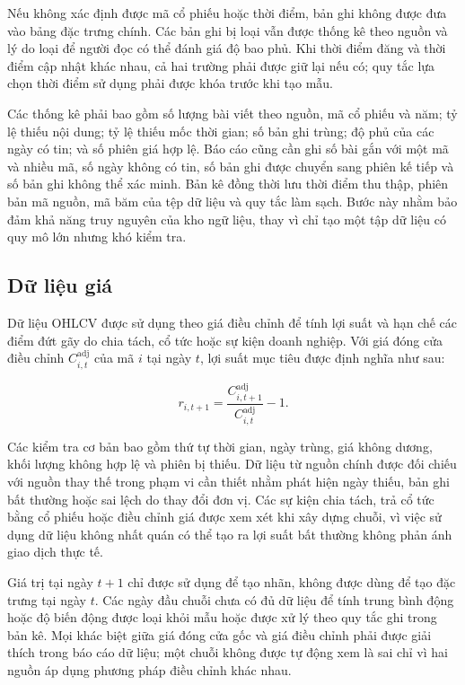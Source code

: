 \documentclass[12pt, a4paper, oneside]{report}
\begin{document}
Nếu không xác định được mã cổ phiếu hoặc thời điểm, bản ghi không được đưa vào bảng
đặc trưng chính. Các bản ghi bị loại vẫn được thống kê theo nguồn và lý do loại để
người đọc có thể đánh giá độ bao phủ. Khi thời điểm đăng và thời điểm cập nhật khác
nhau, cả hai trường phải được giữ lại nếu có; quy tắc lựa chọn thời điểm sử dụng phải
được khóa trước khi tạo mẫu.

Các thống kê phải bao gồm số lượng bài viết theo nguồn, mã cổ phiếu và năm; tỷ lệ
thiếu nội dung; tỷ lệ thiếu mốc thời gian; số bản ghi trùng; độ phủ của các ngày có
tin; và số phiên giá hợp lệ. Báo cáo cũng cần ghi số bài gắn với một mã và nhiều mã,
số ngày không có tin, số bản ghi được chuyển sang phiên kế tiếp và số bản ghi không
thể xác minh. Bản kê đồng thời lưu thời điểm thu thập, phiên bản mã nguồn, mã băm của
tệp dữ liệu và quy tắc làm sạch. Bước này nhằm bảo đảm khả năng truy nguyên của kho
ngữ liệu, thay vì chỉ tạo một tập dữ liệu có quy mô lớn nhưng khó kiểm tra.

\subsection{Dữ liệu giá}

Dữ liệu OHLCV được sử dụng theo giá điều chỉnh để tính lợi suất và hạn chế các điểm
đứt gãy do chia tách, cổ tức hoặc sự kiện doanh nghiệp. Với giá đóng cửa điều chỉnh
$C^{\mathrm{adj}}_{i,t}$ của mã $i$ tại ngày $t$, lợi suất mục tiêu được định nghĩa
như sau:

\begin{equation}
  r_{i,t+1}=\frac{C^{\mathrm{adj}}_{i,t+1}}
  {C^{\mathrm{adj}}_{i,t}}-1.
  \label{eq:next-return}
\end{equation}

Các kiểm tra cơ bản bao gồm thứ tự thời gian, ngày trùng, giá không dương, khối lượng
không hợp lệ và phiên bị thiếu. Dữ liệu từ nguồn chính được đối chiếu với nguồn thay
thế trong phạm vi cần thiết nhằm phát hiện ngày thiếu, bản ghi bất thường hoặc sai lệch
do thay đổi đơn vị. Các sự kiện chia tách, trả cổ tức bằng cổ phiếu hoặc điều chỉnh giá
được xem xét khi xây dựng chuỗi, vì việc sử dụng dữ liệu không nhất quán có thể tạo ra
lợi suất bất thường không phản ánh giao dịch thực tế.

Giá trị tại ngày $t+1$ chỉ được sử dụng để tạo nhãn, không được dùng để tạo đặc trưng
tại ngày $t$. Các ngày đầu chuỗi chưa có đủ dữ liệu để tính trung bình động hoặc độ
biến động được loại khỏi mẫu hoặc được xử lý theo quy tắc ghi trong bản kê. Mọi khác
biệt giữa giá đóng cửa gốc và giá điều chỉnh phải được giải thích trong báo cáo dữ
liệu; một chuỗi không được tự động xem là sai chỉ vì hai nguồn áp dụng phương pháp
điều chỉnh khác nhau.
\end{document}
